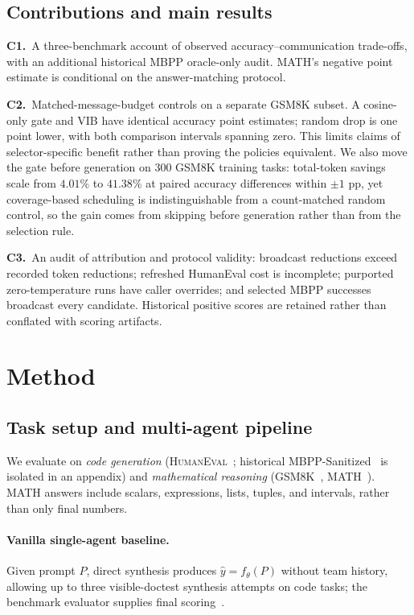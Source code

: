 \documentclass[11pt,twoside,twocolumn,letterpaper]{article}
\begin{document}
\subsection{Contributions and main results}
\textbf{C1.}\, A three-benchmark account of observed accuracy--communication trade-offs, with an additional historical MBPP oracle-only audit. MATH's negative point estimate is conditional on the answer-matching protocol.

\textbf{C2.}\, Matched-message-budget controls on a separate GSM8K subset. A cosine-only gate and VIB have identical accuracy point estimates; random drop is one point lower, with both comparison intervals spanning zero. This limits claims of selector-specific benefit rather than proving the policies equivalent. We also move the gate before generation on $300$ GSM8K training tasks: total-token savings scale from $4.01\%$ to $41.38\%$ at paired accuracy differences within $\pm1$ pp, yet coverage-based scheduling is indistinguishable from a count-matched random control, so the gain comes from skipping before generation rather than from the selection rule.

\textbf{C3.}\, An audit of attribution and protocol validity: broadcast reductions exceed recorded token reductions; refreshed HumanEval cost is incomplete; purported zero-temperature runs have caller overrides; and selected MBPP successes broadcast every candidate. Historical positive scores are retained rather than conflated with scoring artifacts.

\section{Method}\label{sec:method}

\subsection{Task setup and multi-agent pipeline}
We evaluate on \emph{code generation} (\textsc{HumanEval}~\cite{chen2021evaluating}; historical MBPP-Sanitized~\cite{austin2021program} is isolated in an appendix) and \emph{mathematical reasoning} (GSM8K~\cite{hendrycks2021gsm8k}, MATH~\cite{hendrycks2021math}). MATH answers include scalars, expressions, lists, tuples, and intervals, rather than only final numbers.

\paragraph{Vanilla single-agent baseline.} Given prompt $P$, direct synthesis produces $\hat y=f_\theta(P)$ without team history, allowing up to three visible-doctest synthesis attempts on code tasks; the benchmark evaluator supplies final scoring~\cite{chen2021evaluating,austin2021program}.
\end{document}
